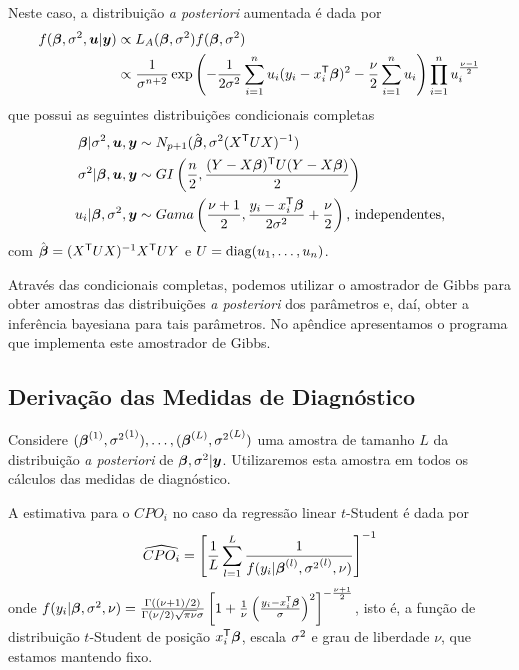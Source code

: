 Neste caso, a distribuição \textit{a posteriori} aumentada é dada por
\begin{equation}
\begin{split}
f({\boldsymbol{\beta}},\sigma^2,{\boldsymbol{u}}|{\boldsymbol{y}}) & \propto L_A({\boldsymbol{\beta}},\sigma^2)f({\boldsymbol{\beta}},\sigma^2) \\
{} & \propto \frac{1}{\sigma^{n+2}}\exp\left(-\frac{1}{2\sigma^2}\sum_{i=1}^nu_i(y_i-x_i ^{\mathsf{T}}{\boldsymbol{\beta}})^2-\frac{\nu}{2}\sum_{i=1}^n u_i\right)\prod_{i=1}^n u_i^\frac{\nu-1}{2}
\end{split}
\end{equation}
que possui as seguintes distribuições condicionais completas
\begin{equation}
\begin{split}
{\boldsymbol{\beta}}|\sigma^2,{\boldsymbol{u}},{\boldsymbol{y}} & \sim N_{p+1}({\hat{\boldsymbol{\beta}}},\sigma^2(X^{\mathsf{T}} UX)^{-1}) \\
\sigma^2|{\boldsymbol{\beta}},{\boldsymbol{u}},{\boldsymbol{y}} & \sim GI\left(\frac{n}{2},\frac{(Y-X{\boldsymbol{\beta}})^{\mathsf{T}} U(Y-X{\boldsymbol{\beta}})}{2}\right)  \\
u_i | {\boldsymbol{\beta}},\sigma^2,{\boldsymbol{y}} & \sim Gama\left(\frac{\nu+1}{2},\frac{y_i-x_i^{\mathsf{T}}{\boldsymbol{\beta}}}{2\sigma^2}+\frac{\nu}{2}\right) \text{, independentes,}
\end{split}
\end{equation}
com ${\hat{\boldsymbol{\beta}}} = (X^{\mathsf{T}} UX)^{-1}X^{\mathsf{T}} UY$ e $U=\operatorname{diag}(u_1,\ldots,u_n)$.

Através das condicionais completas, podemos utilizar o amostrador de Gibbs para obter amostras das distribuições \textit{a posteriori} dos parâmetros e, daí, obter a inferência bayesiana para tais parâmetros. No apêndice apresentamos o programa que implementa este amostrador de Gibbs.

\subsection{Derivação das Medidas de Diagnóstico}

Considere $({\boldsymbol{\beta}}^{(1)},{\sigma^2}^{(1)}),\ldots,
({\boldsymbol{\beta}}^{(L)},{\sigma^2}^{(L)})$ uma amostra de tamanho $L$ da distribuição \textit{a posteriori} de ${\boldsymbol{\beta}},\sigma^2|{\boldsymbol{y}}$. Utilizaremos esta amostra em todos os cálculos das medidas de diagnóstico.

A estimativa para o $CPO_i$ no caso da regressão linear $t$-Student é dada por
\begin{equation}\label{eq:cpo_est_t}
\widehat{CPO_i} = \left[\frac{1}{L}\sum_{l=1}^L\frac{1}{f(y_i|{\boldsymbol{\beta}}^{(l)},{\sigma^2}^{(l)},\nu)}\right]^{-1}
\end{equation}
onde $f(y_i|{\boldsymbol{\beta}},\sigma^2,\nu) = \frac{\Gamma((\nu+1)/2)}{\Gamma(\nu/2)\sqrt{\pi\nu}\sigma}\left[1+\frac{1}{\nu}\left(\frac{y_i-x_i^{\mathsf{T}}{\boldsymbol{\beta}}}{\sigma}\right)^2\right]^{-\frac{\nu+1}{2}}$, isto é, a função de distribuição $t$-Student de posição $x_i^{\mathsf{T}}{\boldsymbol{\beta}}$, escala $\sigma^2$ e grau de liberdade $\nu$, que estamos mantendo fixo.

